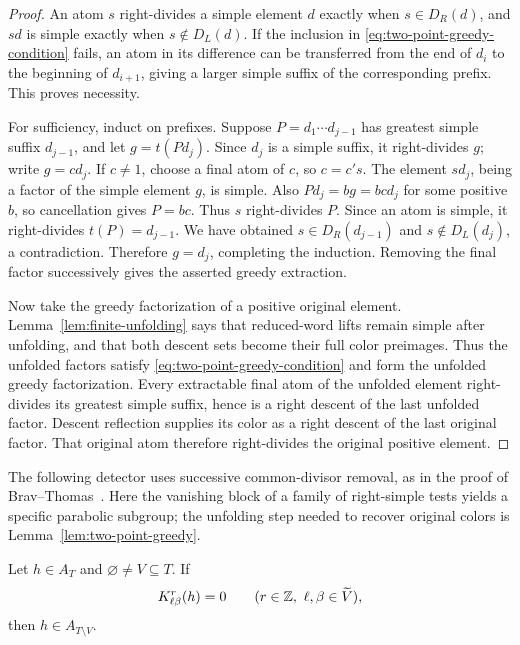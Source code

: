 \begin{proof}
An atom \(s\) right-divides a simple element \(d\) exactly when
\(s\in D_R(d)\), and \(sd\) is simple exactly when
\(s\notin D_L(d)\).  If the inclusion in
\eqref{eq:two-point-greedy-condition} fails, an atom in its difference
can be transferred from the end of \(d_i\) to the beginning of
\(d_{i+1}\), giving a larger simple suffix of the corresponding
prefix.  This proves necessity.

For sufficiency, induct on prefixes.  Suppose
\(P=d_1\cdots d_{j-1}\) has greatest simple suffix \(d_{j-1}\), and
let \(g=t(Pd_j)\).  Since \(d_j\) is a simple suffix, it right-divides
\(g\); write \(g=cd_j\).  If \(c\ne1\), choose a final atom of
\(c\), so \(c=c's\).  The element \(sd_j\), being a factor of the
simple element \(g\), is simple.  Also \(Pd_j=bg=bc d_j\) for some
positive \(b\), so cancellation gives \(P=bc\).  Thus \(s\)
right-divides \(P\).  Since an atom is simple, it right-divides
\(t(P)=d_{j-1}\).  We have obtained
\(s\in D_R(d_{j-1})\) and \(s\notin D_L(d_j)\), a contradiction.
Therefore \(g=d_j\), completing the induction.  Removing the final
factor successively gives the asserted greedy extraction.

Now take the greedy factorization of a positive original element.
Lemma~\ref{lem:finite-unfolding} says that reduced-word lifts remain
simple after unfolding, and that both descent sets become their full
color preimages.  Thus the unfolded factors satisfy
\eqref{eq:two-point-greedy-condition} and form the unfolded greedy
factorization.  Every extractable final atom of the unfolded element
right-divides its greatest simple suffix, hence is a right descent
of the last unfolded factor.  Descent reflection supplies its color
as a right descent of the last original factor.  That original atom
therefore right-divides the original positive element.
\end{proof}

The following detector uses successive common-divisor removal, as in
the proof of Brav--Thomas~\cite[Theorem~3.1]{BravThomas2011}.
Here the vanishing block of a family of right-simple tests yields a
specific parabolic subgroup; the unfolding step needed to recover
original colors is Lemma~\ref{lem:two-point-greedy}.

\begin{lemma}
\label{lem:parabolic-detection}
Let \(h\in A_T\) and \(\varnothing\ne V\subseteq T\).  If
\begin{equation}
\label{eq:two-point-zero-block}
 K^r_{\ell\beta}(h)=0
 \qquad
 (r\in\mathbb Z,\ \ell,\beta\in\widetilde V),
\end{equation}
then \(h\in A_{T\setminus V}\).
\end{lemma}

